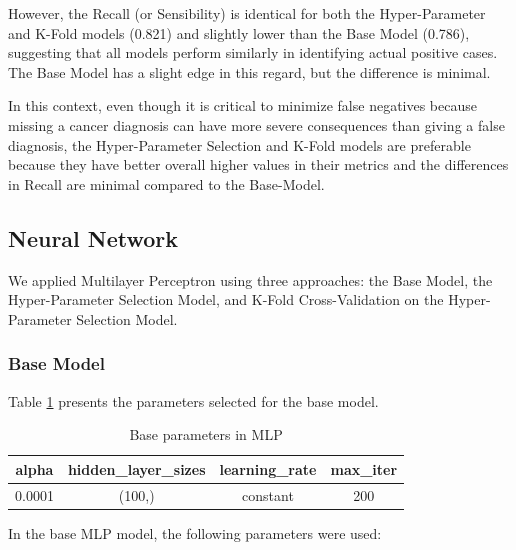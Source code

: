 However, the Recall (or Sensibility) is identical for both the Hyper-Parameter and K-Fold models (0.821) and slightly lower than the Base Model (0.786), suggesting that all models perform similarly in identifying actual positive cases. The Base Model has a slight edge in this regard, but the difference is minimal.

In this context, even though it is critical to minimize false negatives because missing a cancer diagnosis can have more severe consequences than giving a false diagnosis, the Hyper-Parameter Selection and K-Fold models are preferable because they have better overall higher values in their metrics and the differences in Recall are minimal compared to the Base-Model.

\bigskip
\subsection{Neural Network}

We applied Multilayer Perceptron using three approaches: the Base Model, the Hyper-Parameter Selection Model, and K-Fold Cross-Validation on the Hyper-Parameter Selection Model. 

\subsubsection{Base Model}
Table \ref{tab:tab1_mlp} presents the parameters selected for the base model.

\begin{table}[ht]
    \centering
    \caption{Base parameters in MLP} 
    \begin{tabular}{||c c c c||} 
     \hline
     alpha & hidden\_layer\_sizes & learning\_rate & max\_iter  \\ [0.5ex] 
     \hline\hline
     0.0001 & (100,) & constant & 200 \\ 
    \hline
    \end{tabular}
    \label{tab:tab1_mlp}
\end{table}

In the base MLP model, the following parameters were used:

